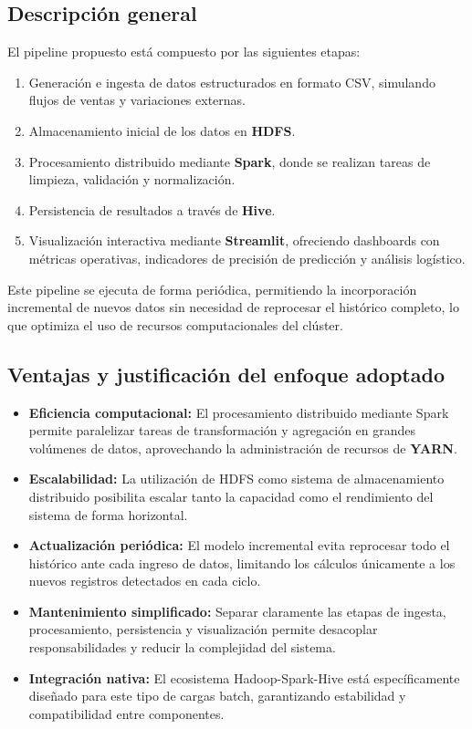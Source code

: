 \documentclass[12pt,a4paper]{article}
\begin{document}
	
	\subsection{Descripción general}
	El pipeline propuesto está compuesto por las siguientes etapas:
	
	\begin{enumerate}
		\item Generación e ingesta de datos estructurados en formato CSV, simulando flujos de ventas y variaciones externas.
		\item Almacenamiento inicial de los datos en \textbf{HDFS}.
		\item Procesamiento distribuido mediante \textbf{Spark}, donde se realizan tareas de limpieza, validación y normalización.
		\item Persistencia de resultados a través de \textbf{Hive}.
		\item Visualización interactiva mediante \textbf{Streamlit}, ofreciendo dashboards con métricas operativas, indicadores de precisión de predicción y análisis logístico.
	\end{enumerate}
	
	Este pipeline se ejecuta de forma periódica, permitiendo la incorporación incremental de nuevos datos sin necesidad de reprocesar el histórico completo, lo que optimiza el uso de recursos computacionales del clúster. 
	
	\subsection{Ventajas y justificación del enfoque adoptado}
	
	\begin{itemize}
		\item \textbf{Eficiencia computacional:} El procesamiento distribuido mediante Spark permite paralelizar tareas de transformación y agregación en grandes volúmenes de datos, aprovechando la administración de recursos de \textbf{YARN}.
		
		\item \textbf{Escalabilidad:} La utilización de HDFS como sistema de almacenamiento distribuido posibilita escalar tanto la capacidad como el rendimiento del sistema de forma horizontal.
		
		\item \textbf{Actualización periódica:} El modelo incremental evita reprocesar todo el histórico ante cada ingreso de datos, limitando los cálculos únicamente a los nuevos registros detectados en cada ciclo.
		
		\item \textbf{Mantenimiento simplificado:} Separar claramente las etapas de ingesta, procesamiento, persistencia y visualización permite desacoplar responsabilidades y reducir la complejidad del sistema.
		
		\item \textbf{Integración nativa:} El ecosistema Hadoop-Spark-Hive está específicamente diseñado para este tipo de cargas batch, garantizando estabilidad y compatibilidad entre componentes.
	\end{itemize}
	
\end{document}
